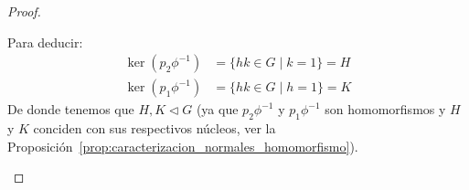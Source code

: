 \begin{teo}
\begin{proof}
\begin{description}
\begin{itemize}
\begin{figure}[H]
\begin{tikzcd}
                            \end{tikzcd}
                        \end{figure}
                        Para deducir:
                        \begin{align*}
                            \ker(p_2\phi^{-1}) &= \{hk\in G \mid k = 1\} = H \\
                            \ker(p_1\phi^{-1}) &= \{hk\in G \mid h = 1\} = K
                        \end{align*}
                        De donde tenemos que $H,K\lhd G$ (ya que $p_2\phi^{-1}$ y $p_1\phi^{-1}$ son homomorfismos y $H$ y $K$ conciden con sus respectivos núcleos, ver la Proposición~\ref{prop:caracterizacion_normales_homomorfismo}).
                \end{itemize}


\end{description}
\end{proof}
\end{teo}
